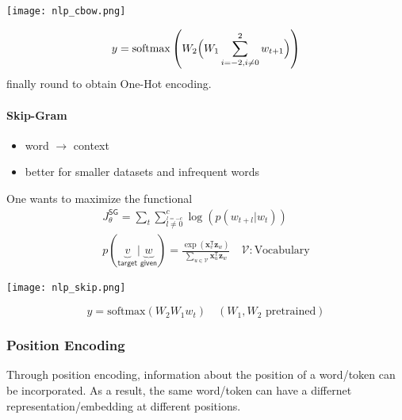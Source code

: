 \newpar{}
\begin{center}
    \texttt{[image: nlp\_cbow.png]}
\end{center}
\noindent\begin{equation*}
    y = \mathrm{softmax} \left(W_2\Bigl(W_1 \sum_{i=-2, i\neq 0}^{2} w_{t+1}\Bigr)\right)
\end{equation*}
finally round to obtain One-Hot encoding.

\paragraph{Skip-Gram}
\begin{itemize}
    \item word $\to$ context
    \item better for smaller datasets and infrequent words
\end{itemize}

One wants to maximize the functional
\noindent\begin{gather*}
    J_{\theta}^{\mathsf{SG}} = \sum_{t}\sum_{\overset{l=-c}{l\neq 0}}^{c} \log(p(w_{t+l}|w_t))\\
    p(\underbrace{v}_{\textsf{target}} | \underbrace{w}_{\textsf{given}})  = \frac{\exp(\mathbf{x}_v^{\mathsf{T}}\mathbf{z}_w)}{\sum\limits_{u\in \mathcal{V}} \mathbf{x}_u^{\mathsf{T}}\mathbf{z}_w} \quad \mathcal{V}: \text{Vocabulary}
\end{gather*}

\newpar{}
\begin{center}
    \texttt{[image: nlp\_skip.png]}
\end{center}
\noindent\begin{equation*}
    y = \mathrm{softmax} \left(W_2 W_1 w_t\right) \quad (W_1, W_2 \text{ pretrained})
\end{equation*}

\subsubsection{Position Encoding}
Through position encoding, information about the position of a word/token can be incorporated. As a result, the same word/token can have a differnet representation/embedding at different positions.
\newpar{}

